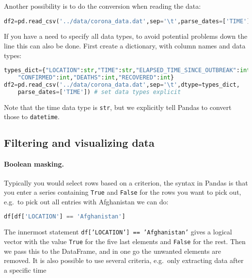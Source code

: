 \documentclass[graybox,sectrefs,envcountresetchap,open=right,final]{svmonodo}
\begin{document}
Another possibility is to do the conversion when reading the data:


\begin{lstlisting}[language=python,style=blue1bar]
df2=pd.read_csv('../data/corona_data.dat',sep='\t',parse_dates=['TIME']) 

\end{lstlisting}

If you have a need to specify all data types, to avoid potential problems down the line this can also be done. First create a dictionary, with column names and data types:





\begin{lstlisting}[language=python,style=blue1bar]
types_dict={"LOCATION":str,"TIME":str,"ELAPSED_TIME_SINCE_OUTBREAK":int,
	"CONFIRMED":int,"DEATHS":int,"RECOVERED":int}
df2=pd.read_csv('../data/corona_data.dat',sep='\t',dtype=types_dict,
	parse_dates=['TIME']) # set data types explicit

\end{lstlisting}

Note that the time data type is \texttt{str}, but we explicitly tell Pandas to convert those to \texttt{datetime}.

\subsection{Filtering and visualizing data}
\paragraph{Boolean masking.}
Typically you would select rows based on a criterion, the syntax in Pandas is that you enter a series containing \texttt{True} and \texttt{False} for the rows you want to pick out, e.g.~to pick out all entries with Afghanistan we can do:


\begin{lstlisting}[language=python,style=blue1bar]
df[df['LOCATION'] == 'Afghanistan']

\end{lstlisting}

The innermost statement \texttt{df['LOCATION'] == 'Afghanistan'} gives a logical vector with the value \texttt{True} for the five last elements and \texttt{False} for the rest. Then we pass this to the DataFrame, and in one go the unwanted elements are removed. It is also possible to use several criteria, e.g.~only extracting data after a specific time
\end{document}
